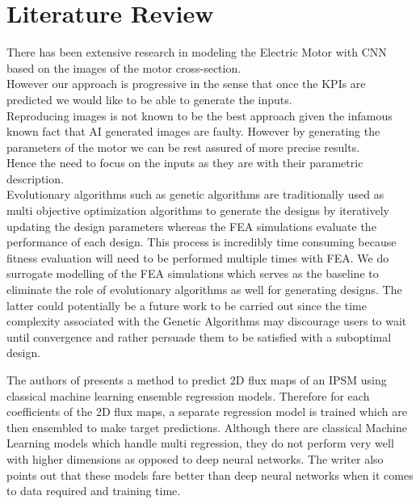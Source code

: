 \documentclass{report} %
\begin{document}
\newpage 

\chapter{Literature Review} 
There has been extensive research in modeling the Electric Motor with \ac{CNN} based on the images of the motor cross-section. \\
However our approach is progressive in the sense that once the \ac{KPI}s are predicted we would like to be able to generate the inputs.\\
Reproducing images is not known to be the best approach given the infamous known fact that AI generated images are faulty. 
However by generating the parameters of the motor we can be rest assured of more precise results. \\
Hence the need to focus on the inputs as they are with their parametric description.\\
Evolutionary algorithms such as genetic algorithms are traditionally used as multi objective optimization algorithms to generate the designs by iteratively
updating the design parameters whereas the \ac{FEA} simulations evaluate the performance of each design.
This process is incredibly time consuming because fitness evaluation will need to be performed multiple times with \ac{FEA}.
We do surrogate modelling of the \ac{FEA} simulations which serves as the baseline to eliminate the role of evolutionary algorithms as well for generating designs.
The latter could potentially be a future work to be carried out since the time complexity associated with the Genetic Algorithms 
may discourage users to wait until convergence and rather persuade them to be satisfied with a suboptimal design.

The authors of \cite{EM 2DFMP-2022} presents a method to predict 2\ac{D} flux maps of an \ac{IPSM} using classical machine learning ensemble regression models.
Therefore for each coefficients of the 2\ac{D} flux maps, a separate regression model is trained which are then ensembled to make target predictions. 
Although there are classical Machine Learning models which handle multi regression, they do not perform very well with higher dimensions as 
opposed to deep neural networks. The writer also points out that these models fare better than deep neural networks when it comes to data required and training time.
\end{document}
